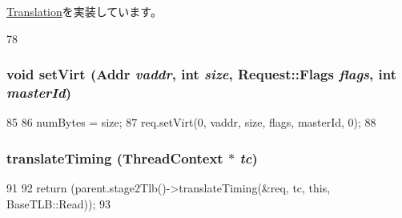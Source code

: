 \hyperlink{classBaseTLB_1_1Translation_ab88d5e1938190b55d7859d5cc4d10446}{Translation}を実装しています。


\begin{DoxyCode}
78 {}
\end{DoxyCode}
\hypertarget{classArmISA_1_1Stage2MMU_1_1Stage2Translation_abd5f91bfdaada4162c7e1974268f748a}{
\subsubsection[{setVirt}]{\setlength{\rightskip}{0pt plus 5cm}void setVirt ({\bf Addr} {\em vaddr}, \/  int {\em size}, \/  {\bf Request::Flags} {\em flags}, \/  int {\em masterId})}}
\label{classArmISA_1_1Stage2MMU_1_1Stage2Translation_abd5f91bfdaada4162c7e1974268f748a}



\begin{DoxyCode}
85         {
86             numBytes = size;
87             req.setVirt(0, vaddr, size, flags, masterId, 0);
88         }
\end{DoxyCode}
\hypertarget{classArmISA_1_1Stage2MMU_1_1Stage2Translation_a10760907ae83cf02c1bb5cd0eafd6497}{
\subsubsection[{translateTiming}]{ translateTiming ({\bf ThreadContext} $\ast$ {\em tc})}}
\label{classArmISA_1_1Stage2MMU_1_1Stage2Translation_a10760907ae83cf02c1bb5cd0eafd6497}



\begin{DoxyCode}
91         {
92             return (parent.stage2Tlb()->translateTiming(&req, tc, this, 
      BaseTLB::Read));
93         }
\end{DoxyCode}


